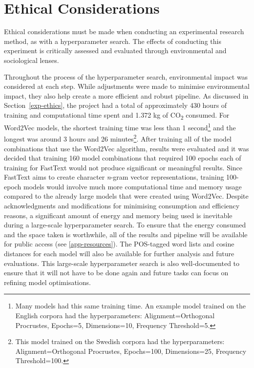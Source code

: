 \section{Ethical Considerations}
\label{sec:ethicalcons}

Ethical considerations must be made when conducting an experimental research method, as with a hyperparameter search. The effects of conducting this experiment is critically assessed and evaluated through environmental and sociological lenses.

Throughout the process of the hyperparameter search, environmental impact was considered at each step. While adjustments were made to minimise environmental impact, they also help create a more efficient and robust pipeline. As discussed in Section~\ref{exp-ethics}, the project had a total of approximately 430 hours of training and computational time spent and 1.372 kg of CO\textsubscript{2} consumed. For Word2Vec models, the shortest training time was less than 1 second\footnote{Many models had this same training time. An example model trained on the English corpora had the hyperparameters: Alignment=Orthogonal Procrustes, Epochs=5, Dimensions=10, Frequency Threshold=5.} and the longest was around 3 hours and 26 minutes\footnote{This model trained on the Swedish corpora had the hyperparameters: Alignment=Orthogonal Procrustes, Epochs=100, Dimensions=25, Frequency Threshold=100.}. After training all of the model combinations that use the Word2Vec algorithm, results were evaluated and it was decided that training 160 model combinations that required 100 epochs each of training for FastText would not produce significant or meaningful results. Since FastText aims to create character \emph{n}-gram vector representations, training 100-epoch models would involve much more computational time and memory usage compared to the already large models that were created using Word2Vec. Despite acknowledgments and modifications for minimising consumption and efficiency reasons, a significant amount of energy and memory being used is inevitable during a large-scale hyperparameter search. To ensure that the energy consumed and the space taken is worthwhile, all of the results and pipeline will be available for public access (see \autoref{app-resources}). The POS-tagged word lists and cosine distances for each model will also be available for further analysis and future evaluations. This large-scale hyperparameter search is also well-documented to ensure that it will not have to be done again and future tasks can focus on refining model optimisations. 

